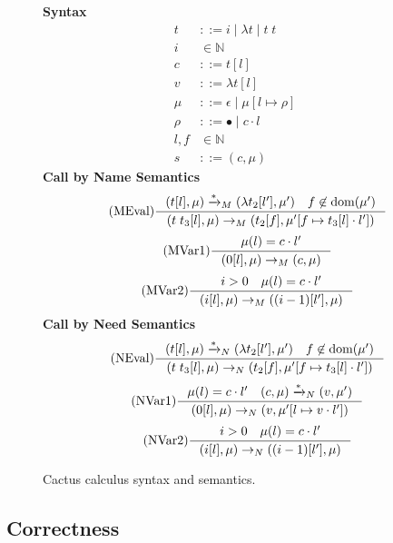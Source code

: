 \begin{figure*}
\textbf{Syntax}
\begin{align*}
\tag{Term} t &::= i \; | \; \lambda t \; | \; t \; t  \\
\tag{Variable} i &\in \mathbb{N}  \\
\tag{Closure} c &::= t [l] \\
\tag{Value} v &::= \lambda t [l] \\
\tag{Heap} \mu &::= \epsilon \; | \; \mu [ l \mapsto \rho ] \\
\tag{Environment} \rho &::= \bullet \; | \; c \cdot l \\
\tag{Location} l,f &\in \mathbb{N}  \\
\tag{State} s &::= (c, \mu)
\end{align*}
\textbf{Call by Name Semantics}
\begin{align*}
\tag{MEval} \inference
{(t[l], \mu) \xrightarrow{* }_{M} (\lambda t_2[l'], \mu') \quad f \not \in \textnormal{dom}(\mu')}
{(t \; t_3[l], \mu) \rightarrow_{M} (t_2[f], \mu'[f \mapsto t_3[l] \cdot l'])}  
\end{align*}
\begin{align*}
\tag{MVar1} \inference 
{\mu(l) = c \cdot l'}
{(0[l],\mu) \rightarrow_M (c,\mu)}
\end{align*}
\begin{align*}
\tag{MVar2} \inference
{i > 0 \quad \mu(l) = c \cdot l'}
{(i[l],\mu) \rightarrow_M ((i-1)[l'],\mu)}
\end{align*}
\textbf{Call by Need Semantics}
\begin{align*}
\tag{NEval} \inference
{(t[l], \mu) \xrightarrow{* }_{N} (\lambda t_2[l'], \mu') \quad f \not \in \textnormal{dom}(\mu')}
{(t \; t_3[l], \mu) \rightarrow_{N} (t_2[f], \mu'[f \mapsto t_3[l] \cdot l'])}  
\end{align*}
\begin{align*}
\tag{NVar1} \inference
{\mu(l) = c \cdot l' \quad (c, \mu) \xrightarrow{* }_{N} (v, \mu')}
{(0[l],\mu) \rightarrow_N (v, \mu'[l \mapsto v \cdot l'])}
\end{align*}
\begin{align*}
\tag{NVar2} \inference
{i > 0 \quad \mu(l) = c \cdot l'}
{(i[l],\mu) \rightarrow_N ((i-1)[l'], \mu)}
\end{align*}
\caption{Cactus calculus syntax and semantics.}
\label{fig:calccact}
\end{figure*}

\subsection{Correctness}

